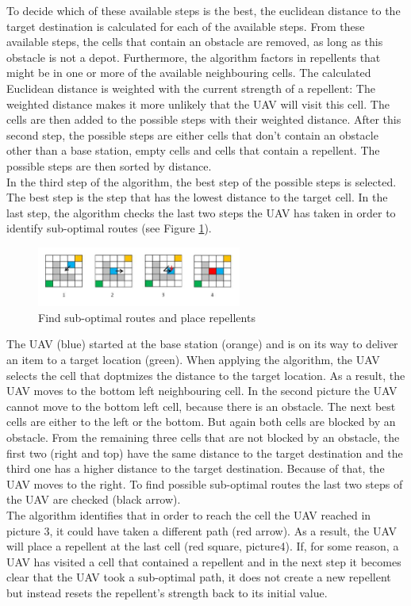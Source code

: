 To decide which of these available steps is the best, the euclidean distance to the target destination is calculated for each of the available steps. From these available steps, the cells that contain an obstacle are removed, as long as this obstacle is not a depot. Furthermore, the algorithm factors in repellents that might be in one or more of the available neighbouring cells.  
The calculated Euclidean distance is weighted with the current strength of a repellent:
\newline
The weighted distance makes it more unlikely that the UAV will visit this cell. 
The cells are then added to the possible steps with their weighted distance.
After this second step, the possible steps are either cells that don't contain an obstacle other than a base station, empty cells and cells that contain a repellent. The possible steps are then sorted by distance.
\\
In the third step of the algorithm, the best step of the possible steps is selected. The best step is the step that has the lowest distance to the target cell. In the last step, the algorithm checks the last two steps the UAV has taken in order to identify sub-optimal routes (see Figure \ref{fig:algo_find_routes}).

\begin{figure}[htbp]\label{fig:algo_find_routes}
	\centering
	\includegraphics[width=0.6\textwidth]{images/algorithm_Picture3.png}
	\caption{Find sub-optimal routes and place repellents} 
\end{figure}

The UAV (blue) started at the base station (orange) and is on its way to deliver an item to a target location (green). When applying the algorithm, the UAV selects the cell that doptmizes the distance to the target location. As a result, the UAV moves to the bottom left neighbouring cell. In the second picture the UAV cannot move to the bottom left cell, because there is an obstacle. The next best cells are either to the left or the bottom. But again both cells are blocked by an obstacle. From the remaining three cells that are not blocked by an obstacle, the first two (right and top) have the same distance to the target destination and the third one has a higher distance to the target destination. Because of that, the UAV moves to the right. To find possible sub-optimal routes the last two steps of the UAV are checked (black arrow).
\\ 
The algorithm identifies that in order to reach the cell the UAV reached in picture 3, it could have taken a different path (red arrow). As a result, the UAV will place a repellent at the last cell (red square, picture4). If, for some reason, a UAV has visited a cell that contained a repellent and in the next step it becomes clear that the UAV took a sub-optimal path, it does not create a new repellent but instead resets the repellent's strength back to its initial value.


